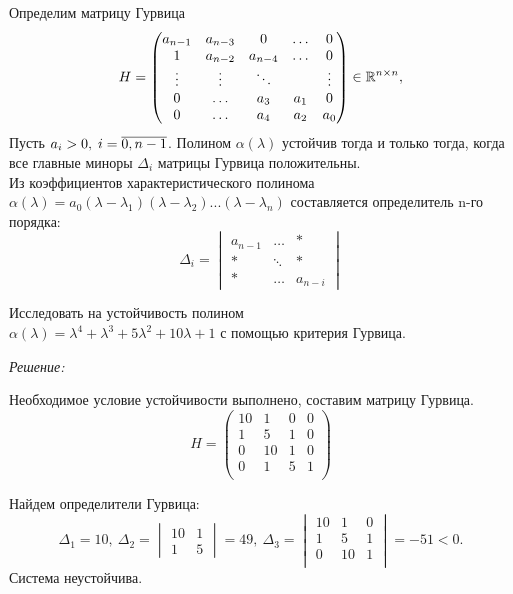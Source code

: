 \documentclass[../../TAU.tex]{subfiles}
\begin{document}
    Определим матрицу Гурвица
    $$
        H =\begin{pmatrix}
            a_{n-1} & a_{n-3} & 0 & \ldots & 0 \\
            1 & a_{n-2} & a_{n-4} & \ldots & 0 \\
            \vdots & \vdots & \ddots && \vdots \\
            0 & \ldots & a_{3} & a_1 & 0 \\
            0 & \ldots & a_4 & a_2 & a_0
        \end{pmatrix}\in\mathbb{R}^{n\times n},
    $$
    \theor[Гурвица] Пусть 
    $a_i>0,\; i=\overline{0,n-1}$.
    Полином $\alpha(\lambda)$ устойчив тогда и только тогда, когда все главные миноры $\Delta_i$ матрицы Гурвица положительны. \\
    Из коэффициентов характеристического полинома 
    $\alpha(\lambda)=a_0(\lambda-\lambda_1) (\lambda-\lambda_2) ... (\lambda-\lambda_n)$
    составляется определитель n-го порядка:
    $$
        \Delta_i =
        \begin{vmatrix}
            a_{n-1}& \ldots& *\\
            *& \ddots & *\\
            *& \ldots & a_{n-i}
        \end{vmatrix}
    $$

    \examp Исследовать на устойчивость полином\\
    $\alpha(\lambda) = \lambda^4+\lambda^3+5\lambda^2+10\lambda+1$ 
    с помощью критерия Гурвица.

    {\it Решение:}\par
    Необходимое условие устойчивости выполнено, составим матрицу Гурвица.
    $$
        H = 
        \begin{pmatrix}
            10 & 1 & 0 & 0\\
            1 & 5 & 1 & 0 \\
            0 & 10 & 1 & 0\\
            0 & 1 & 5 & 1 \\
        \end{pmatrix}
    $$

    Найдем определители Гурвица: 
    $$
    \Delta_1=10,\ \Delta_2 = 
    \begin{vmatrix}
        10 & 1\\
        1  & 5
    \end{vmatrix}
    =49,\ \Delta_3=
    \begin{vmatrix}
        10 & 1 & 0\\
        1  & 5 & 1\\
        0 & 10 & 1\\
    \end{vmatrix}
    =-51<0.
    $$
    Система неустойчива.
\end{document}
